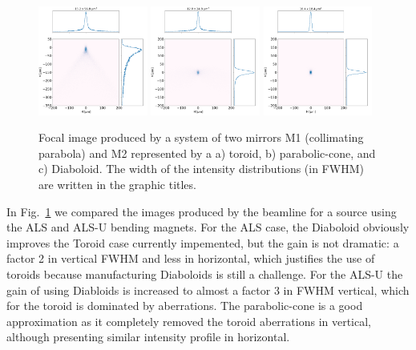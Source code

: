 \documentclass{iucr}              %
\begin{document}
\begin{figure}[h]
\includegraphics[width=0.32\textwidth]{figures/alsu_toroid.png}
\includegraphics[width=0.32\textwidth]{figures/alsu_parabolic-cone.png}
\includegraphics[width=0.32\textwidth]{figures/alsu_diaboloid.png}
\caption{\label{fig:als}Focal image produced by a system of two mirrors M1 (collimating parabola) and M2 represented by a a) toroid, b) parabolic-cone, and c) Diaboloid. The width of the intensity distributions (in FWHM) are written in the graphic titles. 
}
\end{figure}

In Fig.~\ref{fig:als} we compared the images produced by the beamline for a source using the ALS and ALS-U bending magnets. For the ALS case, the Diaboloid obviously improves the Toroid case currently impemented, but the gain is not dramatic: a factor 2 in vertical FWHM and less in horizontal, which justifies the use of toroids because manufacturing Diaboloids is still a challenge. For the ALS-U the gain of using Diabloids is increased to almost a factor 3 in FWHM vertical, which for the toroid is dominated by aberrations. The parabolic-cone is a good approximation as it completely removed the toroid aberrations in vertical, although presenting similar intensity profile in horizontal.
\end{document}
